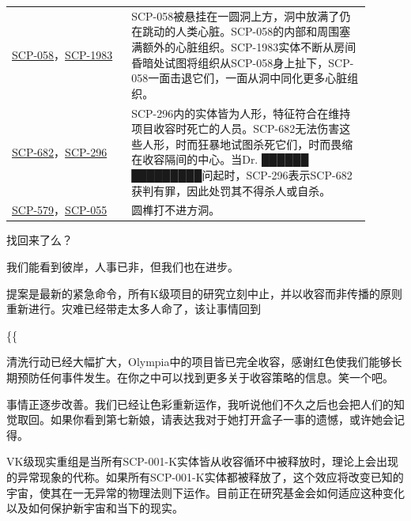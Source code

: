 \begin{longtable}{m{0.3\linewidth}m{0.6\linewidth}}
\hyperref[chap:SCP-058]{SCP-058}，\hyperref[chap:SCP-1983]{SCP-1983} & SCP-058被悬挂在一圆洞上方，洞中放满了仍在跳动的人类心脏。SCP-058的内部和周围塞满额外的心脏组织。SCP-1983实体不断从房间昏暗处试图将组织从SCP-058身上扯下，SCP-058一面击退它们，一面从洞中同化更多心脏组织。\\
\hyperref[chap:SCP-682]{SCP-682}，\hyperref[chap:SCP-296]{SCP-296} & SCP-296内的实体皆为人形，特征符合在维持项目收容时死亡的人员。SCP-682无法伤害这些人形，时而狂暴地试图杀死它们，时而畏缩在收容隔间的中心。当Dr. ██████ █████████问起时，SCP-296表示SCP-682获判有罪，因此处罚其不得杀人或自杀。\\
\hyperref[chap:SCP-579]{SCP-579}，\hyperref[chap:SCP-055]{SCP-055} & 圆榫打不进方洞。
\end{longtable}




\begin{scpbox}

找回来了么？

我们能看到彼岸，人事已非，但我们也在进步。

提案是最新的紧急命令，所有K级项目的研究立刻中止，并以收容而非传播的原则重新进行。灾难已经带走太多人命了，该让事情回到

\{\{

清洗行动已经大幅扩大，Olympia中的项目皆已完全收容，感谢红色使我们能够长期预防任何事件发生。在你之中可以找到更多关于收容策略的信息。笑一个吧。

事情正逐步改善。我们已经让色彩重新运作，我听说他们不久之后也会把人们的知觉取回。如果你看到第七新娘，请表达我对于她打开盒子一事的遗憾，或许她会记得。

\end{scpbox}

VK级现实重组是当所有SCP-001-K实体皆从收容循环中被释放时，理论上会出现的异常现象的代称。如果所有SCP-001-K实体都被释放了，这个效应将改变已知的宇宙，使其在一无异常的物理法则下运作。目前正在研究基金会如何适应这种变化以及如何保护新宇宙和当下的现实。

